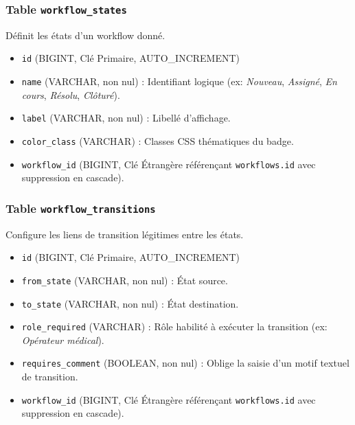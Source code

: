 \documentclass[12pt,a4paper]{article}
\begin{document}
\subsubsection{Table \texttt{workflow\_states}}
Définit les états d'un workflow donné.
\begin{itemize}
    \item \texttt{id} (BIGINT, Clé Primaire, AUTO\_INCREMENT)
    \item \texttt{name} (VARCHAR, non nul) : Identifiant logique (ex: \textit{Nouveau}, \textit{Assigné}, \textit{En cours}, \textit{Résolu}, \textit{Clôturé}).
    \item \texttt{label} (VARCHAR, non nul) : Libellé d'affichage.
    \item \texttt{color\_class} (VARCHAR) : Classes CSS thématiques du badge.
    \item \texttt{workflow\_id} (BIGINT, Clé Étrangère référençant \texttt{workflows.id} avec suppression en cascade).
\end{itemize}

\subsubsection{Table \texttt{workflow\_transitions}}
Configure les liens de transition légitimes entre les états.
\begin{itemize}
    \item \texttt{id} (BIGINT, Clé Primaire, AUTO\_INCREMENT)
    \item \texttt{from\_state} (VARCHAR, non nul) : État source.
    \item \texttt{to\_state} (VARCHAR, non nul) : État destination.
    \item \texttt{role\_required} (VARCHAR) : Rôle habilité à exécuter la transition (ex: \textit{Opérateur médical}).
    \item \texttt{requires\_comment} (BOOLEAN, non nul) : Oblige la saisie d'un motif textuel de transition.
    \item \texttt{workflow\_id} (BIGINT, Clé Étrangère référençant \texttt{workflows.id} avec suppression en cascade).
\end{itemize}
\end{document}
